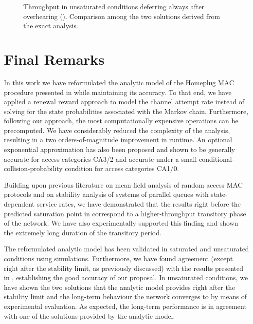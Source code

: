 \documentclass[preprint,12pt]{elsarticle}
\begin{document}
\begin{figure*}[!tb]
\centering
{}
\caption{Throughput in unsaturated conditions deferring always after overhearing (). Comparison among the two solutions derived from the exact analysis.}
\label{fig:unsat_always_defer}
\end{figure*}

\section{Final Remarks}\label{sec:remarks}

In this work we have reformulated the analytic model of the Homeplug MAC procedure presented in \cite{chung2006performance} while maintaining its accuracy. To that end, we have applied a renewal reward approach to model the channel attempt rate instead of solving for the state probabilities associated with the Markov chain. Furthermore, following our approach, the most computationally expensive operations can be precomputed. We have considerably reduced the complexity of the analysis, resulting in a two orders-of-magnitude improvement in runtime. An optional exponential approximation has also been proposed and shown to be generally accurate for access categories CA3/2 and accurate under a small-conditional-collision-probability condition for access categories CA1/0.

Building upon previous literature on mean field analysis of random access MAC protocols and on stability analysis of systems of parallel queues with state-dependent service rates, we have demonstrated that the results right before the predicted saturation point in \cite{chung2006performance} correspond to a higher-throughput transitory phase of the network. We have also experimentally supported this finding and shown the extremely long duration of the transitory period. 

The reformulated analytic model has been validated in saturated and unsaturated conditions using simulations. Furthermore, we have found agreement (except right after the stability limit, as previously discussed) with the results presented in \cite{chung2006performance}, establishing the good accuracy of our proposal. In unsaturated conditions, we have shown the two solutions that the analytic model provides right after the stability limit and the long-term behaviour the network converges to by means of experimental evaluation. As expected, the long-term performance is in agreement with one of the solutions provided by the analytic model. 
\end{document}
